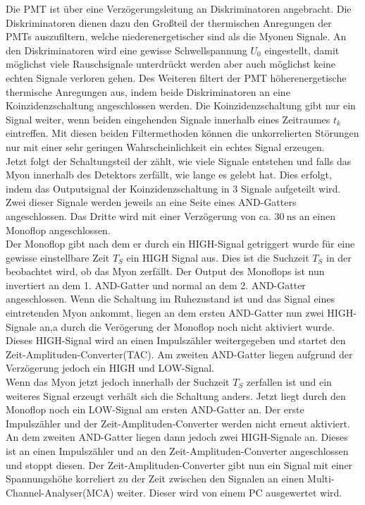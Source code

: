     Die PMT ist über eine Verzögerungsleitung an Diskriminatoren angebracht.
    Die Diskriminatoren dienen dazu den Großteil der thermischen Anregungen der PMTs auszufiltern, welche niederenergetischer sind als die Myonen Signale.
    An den Diskriminatoren wird eine gewisse Schwellspannung $U_0$ eingestellt, damit möglichst viele Rauschsignale unterdrückt werden aber auch möglichst keine echten Signale verloren gehen.
    Des Weiteren filtert der PMT höherenergetische thermische Anregungen aus, indem beide Diskriminatoren an eine Koinzidenzschaltung angeschlossen werden.
    Die Koinzidenzschaltung gibt nur ein Signal weiter, wenn beiden eingehenden Signale innerhalb eines Zeitraumes $t_k$ eintreffen.
    Mit diesen beiden Filtermethoden können die unkorrelierten Störungen nur mit einer sehr geringen Wahrscheinlichkeit ein echtes Signal erzeugen.\\
    Jetzt folgt der Schaltungsteil der zählt, wie viele Signale entstehen und falls das Myon innerhalb des Detektors zerfällt, wie lange es gelebt hat.
    Dies erfolgt, indem das Outputsignal der Koinzidenzschaltung in 3 Signale aufgeteilt wird.
    Zwei dieser Signale werden jeweils an eine Seite eines AND-Gatters angeschlossen. Das Dritte wird mit einer Verzögerung von ca. $\SI{30}{\nano\second}$ an einen Monoflop angeschlossen.\\
    Der Monoflop gibt nach dem er durch ein HIGH-Signal getriggert wurde für eine gewisse einstellbare Zeit $T_S$ ein HIGH Signal aus. Dies ist die Suchzeit $T_S$ in der beobachtet wird, ob das Myon zerfällt.
    Der Output des Monoflops ist nun invertiert an dem 1. AND-Gatter und normal an dem 2. AND-Gatter angeschlossen.
    Wenn die Schaltung im Ruhezustand ist und das Signal eines eintretenden Myon ankommt, 
    liegen an dem ersten AND-Gatter nun zwei HIGH-Signale an,a durch die Verögerung der Monoflop noch nicht aktiviert wurde.
    Dieses HIGH-Signal wird an einen Impulszähler weitergegeben und startet den Zeit-Amplituden-Converter(TAC).
    Am zweiten AND-Gatter liegen aufgrund der Verzögerung jedoch ein HIGH und LOW-Signal.\\
    Wenn das Myon jetzt jedoch innerhalb der Suchzeit $T_S$ zerfallen ist und ein weiteres Signal erzeugt verhält sich die Schaltung anders.
    Jetzt liegt durch den Monoflop noch ein LOW-Signal am ersten AND-Gatter an.
    Der erste Impulszähler und der Zeit-Amplituden-Converter werden nicht erneut aktiviert.
    An dem zweiten AND-Gatter liegen dann jedoch zwei HIGH-Signale an. Dieses ist an einen Impulszähler und an den Zeit-Amplituden-Converter angeschlossen und stoppt diesen.
    Der Zeit-Amplituden-Converter gibt nun ein Signal mit einer Spannungshöhe korreliert zu der Zeit zwischen den Signalen an einen Multi-Channel-Analyser(MCA) weiter.
    Dieser wird von einem PC ausgewertet wird.

